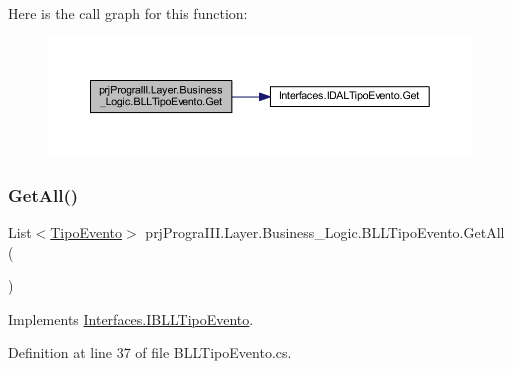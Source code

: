 Here is the call graph for this function\+:
\nopagebreak
\begin{figure}[H]
\begin{center}
\leavevmode
\includegraphics[width=350pt]{classprj_progra_i_i_i_1_1_layer_1_1_business___logic_1_1_b_l_l_tipo_evento_ad78fc8f36ab176729080a6720f1627d5_cgraph}
\end{center}
\end{figure}
\hypertarget{classprj_progra_i_i_i_1_1_layer_1_1_business___logic_1_1_b_l_l_tipo_evento_a37e2d53e8cc54bfcdd0f3a89caad53cc}{}\label{classprj_progra_i_i_i_1_1_layer_1_1_business___logic_1_1_b_l_l_tipo_evento_a37e2d53e8cc54bfcdd0f3a89caad53cc} 
\subsubsection{\texorpdfstring{Get\+All()}{GetAll()}}
{\footnotesize\ttfamily List$<$\hyperlink{classprj_progra_i_i_i_1_1_layer_1_1_entities_1_1_tipo_evento}{Tipo\+Evento}$>$ prj\+Progra\+I\+I\+I.\+Layer.\+Business\+\_\+\+Logic.\+B\+L\+L\+Tipo\+Evento.\+Get\+All (\begin{DoxyParamCaption}{ }\end{DoxyParamCaption})}



Implements \hyperlink{interface_interfaces_1_1_i_b_l_l_tipo_evento_a9491bc76d279f88a5f33ce3a63c84302}{Interfaces.\+I\+B\+L\+L\+Tipo\+Evento}.



Definition at line 37 of file B\+L\+L\+Tipo\+Evento.\+cs.

